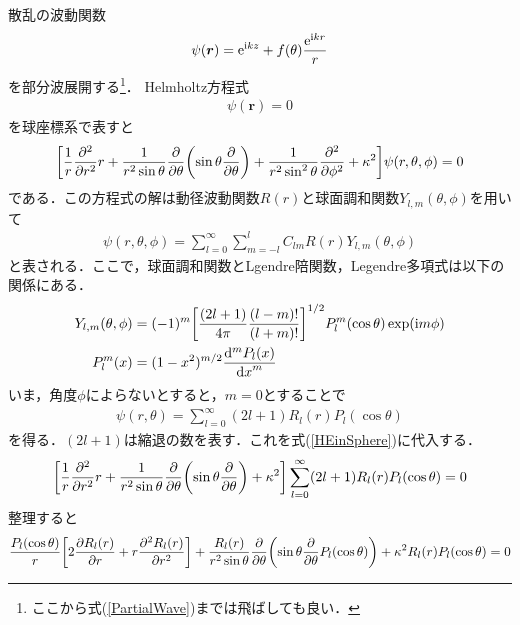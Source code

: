 \documentclass{report}
\begin{document}
  散乱の波動関数
  \begin{align}
    \psi(\bm{r}) = \mathrm{e}^{\mathrm{i} kz} + f(\theta)\frac{\mathrm{e}^{\mathrm{i} kr}}{r}
  \end{align}
  を部分波展開する\footnote{ここから式(\ref{PartialWave})までは飛ばしても良い．}．
  Helmholtz方程式
  \begin{align}
    [\nabla^2 + \kappa^2]\psi(\bm{r}) = 0
  \end{align}
  を球座標系で表すと
  \begin{align}
    \label{HEinSphere}
    \qty[\frac{1}{r}\frac{\partial^2}{\partial r^2}r + \frac{1}{r^2 \sin \theta} \frac{\partial}{\partial \theta}\qty(\sin\theta\frac{\partial}{\partial \theta})
    + \frac{1}{r^2 \sin^2\theta}\frac{\partial^2}{\partial \phi^2} + \kappa^2]\psi(r,\theta,\phi) = 0
  \end{align}
  である．この方程式の解は動径波動関数$R(r)$と球面調和関数$Y_{l,m}(\theta, \phi)$を用いて
  \begin{align}
    \psi(r,\theta,\phi) = \sum_{l=0}^{\infty}\sum_{m=-l}^{l}C_{lm}R(r)Y_{l,m}(\theta,\phi)
  \end{align}
  と表される．ここで，球面調和関数とLgendre陪関数，Legendre多項式は以下の関係にある．
  \begin{align}
    Y_{l,m}(\theta,\phi) &= (-1)^m \qty[\frac{(2l+1)}{4\pi}\frac{(l-m)!}{(l+m)!}]^{1/2}P_l^m(\cos\theta)\exp(\mathrm{i} m\phi)\\
    P_l^m(x) &= (1-x^2)^{m/2} \frac{\mathrm{d}^m P_l(x)}{\dd{x}^m}
  \end{align}
  いま，角度$\phi$によらないとすると，$m=0$とすることで
  \begin{align}
    \psi(r,\theta) = \sum_{l=0}^{\infty} (2l+1)R_l(r)P_l(\cos\theta)
  \end{align}
  を得る．$(2l+1)$は縮退の数を表す．これを式(\ref{HEinSphere})に代入する．
  \begin{align}
    \qty[\frac{1}{r}\frac{\partial^2}{\partial r^2}r + \frac{1}{r^2 \sin \theta} \frac{\partial}{\partial \theta}\qty(\sin\theta\frac{\partial}{\partial \theta})
    + \kappa^2] \sum_{l=0}^{\infty} (2l+1)R_l(r)P_l(\cos\theta)= 0
  \end{align}
  整理すると
  \begin{align}
    \label{Helmholtz separated}
    \frac{P_l(\cos\theta)}{r}\qty[2\frac{\partial R_l(r)}{\partial r} + r \frac{\partial^2 R_l(r)}{\partial r^2}]
    + \frac{R_l(r)}{r^2 \sin \theta} \frac{\partial}{\partial \theta}\qty(\sin\theta\frac{\partial}{\partial\theta}P_l(\cos\theta)) + \kappa^2 R_l(r)P_l(\cos\theta) = 0
  \end{align}
\end{document}
